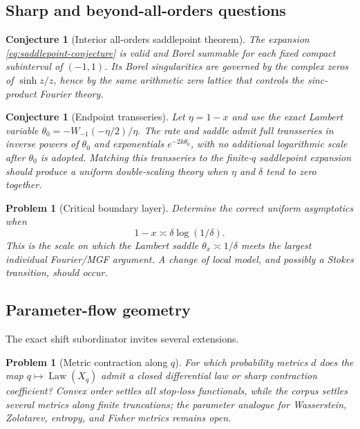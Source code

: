 \documentclass[11pt,a4paper]{article}
\newtheorem{conjecture}[theorem]{Conjecture}
\newtheorem{problem}[theorem]{Problem}
\theoremstyle{definition}
\newcommand{\Law}{\operatorname{Law}}
\newcommand{\1}{\mathbf{1}}
\begin{document}
\subsection{Sharp and beyond-all-orders questions}

\begin{conjecture}[Interior all-orders saddlepoint theorem]
The expansion \eqref{eq:saddlepoint-conjecture} is valid and Borel summable
for each fixed compact subinterval of $(-1,1)$.  Its Borel singularities are
governed by the complex zeros of $\sinh z/z$, hence by the same arithmetic
zero lattice that controls the sinc-product Fourier theory.
\end{conjecture}

\begin{conjecture}[Endpoint transseries]
Let $\eta=1-x$ and use the exact Lambert variable
$\theta_0=-W_{-1}(-\eta/2)/\eta$.  The rate and saddle admit full transseries
in inverse powers of $\theta_0$ and exponentials $e^{-2k\theta_0}$, with no
additional logarithmic scale after $\theta_0$ is adopted.  Matching this
transseries to the finite-$q$ saddlepoint expansion should produce a uniform
double-scaling theory when $\eta$ and $\delta$ tend to zero together.
\end{conjecture}

\begin{problem}[Critical boundary layer]
Determine the correct uniform asymptotics when
\[
 1-x\asymp \delta\log(1/\delta).
\]
This is the scale on which the Lambert saddle
$\theta_x\asymp1/\delta$ meets the largest individual Fourier/MGF argument.
A change of local model, and possibly a Stokes transition, should occur.
\end{problem}

\subsection{Parameter-flow geometry}

The exact shift subordinator invites several extensions.

\begin{problem}[Metric contraction along $q$]
For which probability metrics $d$ does the map $q\mapsto\Law(X_q)$ admit a
closed differential law or sharp contraction coefficient?  Convex order
settles all stop-loss functionals, while the corpus settles several metrics
along finite truncations; the parameter analogue for Wasserstein,
Zolotarev, entropy, and Fisher metrics remains open.
\end{problem}
\end{document}
